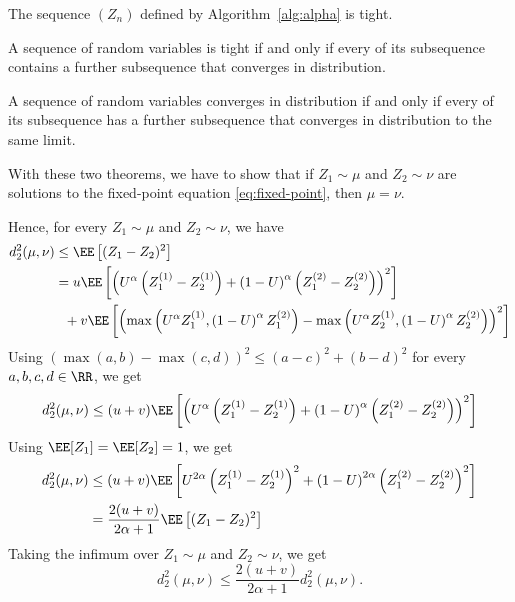 \begin{lemma}
  The sequence $(Z_n)$ defined by Algorithm~\ref{alg:alpha} is tight.
\end{lemma}

\begin{theorem}[Prokhorov]
  A sequence of random variables is tight if and only if every of its subsequence contains a further subsequence that converges in distribution.
\end{theorem}

\begin{theorem}
  A sequence of random variables converges in distribution if and only if every of its subsequence has a further subsequence that converges in distribution to the same limit.
\end{theorem}

With these two theorems, we have to show that if $Z_1 \sim \mu$ and $Z_2 \sim \nu$ are solutions to the fixed-point equation \eqref{eq:fixed-point}, then $\mu = \nu$.

Hence, for every $Z_1\sim \mu$ and $Z_2\sim \nu$, we have
\begin{align*}
  d_2^2(\mu, \nu)
   & \le \EE\left[(Z_1-Z_2)^2\right]                                                                                                                                                                  \\
   & = u\EE\left[\left(U^{\alpha} \left(Z_1^{(1)}-Z_2^{(1)}\right) + \left(1-U\right)^{\alpha} \left(Z_1^{(2)}-Z_2^{(2)}\right)\right)^2\right]                                                       \\
   & \,\,\,\, + v\EE\left[\left(\max\left(U^{\alpha} Z_1^{(1)}, \left(1-U\right)^{\alpha} Z_1^{(2)}\right)-\max\left(U^{\alpha} Z_2^{(1)}, \left(1-U\right)^{\alpha} Z_2^{(2)}\right)\right)^2\right] \\
\end{align*}
Using $(\max(a,b)-\max(c,d))^2 \le (a-c)^2 + (b-d)^2$ for every $a,b,c,d\in\RR$, we get
\begin{align*}
  d_2^2(\mu, \nu)
   & \le (u+v)\EE\left[\left(U^{\alpha} \left(Z_1^{(1)}-Z_2^{(1)}\right) + \left(1-U\right)^{\alpha} \left(Z_1^{(2)}-Z_2^{(2)}\right)\right)^2\right] \\
\end{align*}
Using $\EE[Z_1]=\EE[Z_2]=1$, we get
\begin{align*}
  d_2^2(\mu, \nu)
   & \le (u+v)\EE\left[U^{2\alpha} \left(Z_1^{(1)}-Z_2^{(1)}\right)^2 + \left(1-U\right)^{2\alpha} \left(Z_1^{(2)}-Z_2^{(2)}\right)^2\right] \\
   & = \dfrac{2(u+v)}{2\alpha+1}\EE\left[(Z_1-Z_2)^2\right]
\end{align*}
Taking the infimum over $Z_1\sim \mu$ and $Z_2\sim \nu$, we get
$$d_2^2(\mu, \nu) \le \dfrac{2(u+v)}{2\alpha+1}d_2^2(\mu, \nu).$$

